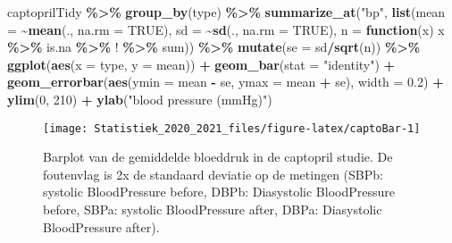 \documentclass[
  12pt,dutch,coursenotes]{book}
\newenvironment{Shaded}{\begin{snugshade}}{\end{snugshade}}
\newcommand{\ControlFlowTok}[1]{\textcolor[rgb]{0.13,0.29,0.53}{\textbf{#1}}}
\newcommand{\DataTypeTok}[1]{\textcolor[rgb]{0.13,0.29,0.53}{#1}}
\newcommand{\DecValTok}[1]{\textcolor[rgb]{0.00,0.00,0.81}{#1}}
\newcommand{\FloatTok}[1]{\textcolor[rgb]{0.00,0.00,0.81}{#1}}
\newcommand{\KeywordTok}[1]{\textcolor[rgb]{0.13,0.29,0.53}{\textbf{#1}}}
\newcommand{\NormalTok}[1]{#1}
\newcommand{\OperatorTok}[1]{\textcolor[rgb]{0.81,0.36,0.00}{\textbf{#1}}}
\newcommand{\OtherTok}[1]{\textcolor[rgb]{0.56,0.35,0.01}{#1}}
\newcommand{\StringTok}[1]{\textcolor[rgb]{0.31,0.60,0.02}{#1}}
\theoremstyle{definition}
\theoremstyle{definition}
\theoremstyle{definition}
\theoremstyle{remark}
\begin{document}
\begin{Shaded}
\begin{Highlighting}[]
\NormalTok{captoprilTidy }\OperatorTok{\%\textgreater{}\%}\StringTok{ }\KeywordTok{group\_by}\NormalTok{(type) }\OperatorTok{\%\textgreater{}\%}\StringTok{ }\KeywordTok{summarize\_at}\NormalTok{(}\StringTok{"bp"}\NormalTok{, }
    \KeywordTok{list}\NormalTok{(}\DataTypeTok{mean =} \OperatorTok{\textasciitilde{}}\KeywordTok{mean}\NormalTok{(., }\DataTypeTok{na.rm =} \OtherTok{TRUE}\NormalTok{), }\DataTypeTok{sd =} \OperatorTok{\textasciitilde{}}\KeywordTok{sd}\NormalTok{(., }
        \DataTypeTok{na.rm =} \OtherTok{TRUE}\NormalTok{), }\DataTypeTok{n =} \ControlFlowTok{function}\NormalTok{(x) x }\OperatorTok{\%\textgreater{}\%}\StringTok{ }\NormalTok{is.na }\OperatorTok{\%\textgreater{}\%}\StringTok{ }
\StringTok{        \textasciigrave{}}\DataTypeTok{!}\StringTok{\textasciigrave{}} \OperatorTok{\%\textgreater{}\%}\StringTok{ }\NormalTok{sum)) }\OperatorTok{\%\textgreater{}\%}\StringTok{ }\KeywordTok{mutate}\NormalTok{(}\DataTypeTok{se =}\NormalTok{ sd}\OperatorTok{/}\KeywordTok{sqrt}\NormalTok{(n)) }\OperatorTok{\%\textgreater{}\%}\StringTok{ }
\StringTok{    }\KeywordTok{ggplot}\NormalTok{(}\KeywordTok{aes}\NormalTok{(}\DataTypeTok{x =}\NormalTok{ type, }\DataTypeTok{y =}\NormalTok{ mean)) }\OperatorTok{+}\StringTok{ }\KeywordTok{geom\_bar}\NormalTok{(}\DataTypeTok{stat =} \StringTok{"identity"}\NormalTok{) }\OperatorTok{+}\StringTok{ }
\StringTok{    }\KeywordTok{geom\_errorbar}\NormalTok{(}\KeywordTok{aes}\NormalTok{(}\DataTypeTok{ymin =}\NormalTok{ mean }\OperatorTok{{-}}\StringTok{ }\NormalTok{se, }\DataTypeTok{ymax =}\NormalTok{ mean }\OperatorTok{+}\StringTok{ }
\StringTok{        }\NormalTok{se), }\DataTypeTok{width =} \FloatTok{0.2}\NormalTok{) }\OperatorTok{+}\StringTok{ }\KeywordTok{ylim}\NormalTok{(}\DecValTok{0}\NormalTok{, }\DecValTok{210}\NormalTok{) }\OperatorTok{+}\StringTok{ }\KeywordTok{ylab}\NormalTok{(}\StringTok{"blood pressure (mmHg)"}\NormalTok{)}
\end{Highlighting}
\end{Shaded}

\begin{figure}

{\centering \texttt{[image: Statistiek\_2020\_2021\_files/figure-latex/captoBar-1]} 

}

\caption{Barplot van de gemiddelde bloeddruk in de captopril studie. De foutenvlag is 2x de standaard deviatie op de metingen (SBPb: systolic BloodPressure before, DBPb: Diasystolic BloodPressure before, SBPa: systolic BloodPressure after, DBPa: Diasystolic BloodPressure after).}\label{fig:captoBar}
\end{figure}
\end{document}
